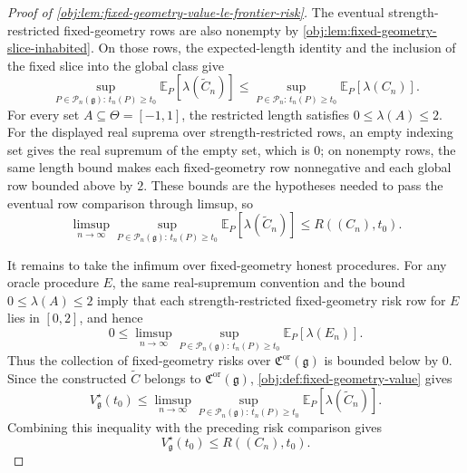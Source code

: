 \begin{proof}[Proof of \cref{obj:lem:fixed-geometry-value-le-frontier-risk}]
The eventual strength-restricted fixed-geometry rows are also nonempty by \cref{obj:lem:fixed-geometry-slice-inhabited}.  On those rows, the expected-length identity and the inclusion of the fixed slice into the global class give
\[
\sup_{P\in\mathcal P_n(\mathfrak g):\,t_n(P)\ge t_0}
\mathbb E_P[\lambda(\widetilde C_n)]
\le
\sup_{P\in\mathcal P_n:\,t_n(P)\ge t_0}
\mathbb E_P[\lambda(C_n)].
\]
For every set \(A\subseteq\Theta=[-1,1]\), the restricted length satisfies \(0\le\lambda(A)\le2\).  For the displayed real suprema over strength-restricted rows, an empty indexing set gives the real supremum of the empty set, which is \(0\); on nonempty rows, the same length bound makes each fixed-geometry row nonnegative and each global row bounded above by \(2\).  These bounds are the hypotheses needed to pass the eventual row comparison through limsup, so
\[
\limsup_{n\to\infty}
\sup_{P\in\mathcal P_n(\mathfrak g):\,t_n(P)\ge t_0}
\mathbb E_P[\lambda(\widetilde C_n)]
\le
R((C_n),t_0).
\]

It remains to take the infimum over fixed-geometry honest procedures.  For any oracle procedure \(E\), the same real-supremum convention and the bound \(0\le\lambda(A)\le2\) imply that each strength-restricted fixed-geometry risk row for \(E\) lies in \([0,2]\), and hence
\[
0\le
\limsup_{n\to\infty}
\sup_{P\in\mathcal P_n(\mathfrak g):\,t_n(P)\ge t_0}
\mathbb E_P[\lambda(E_n)].
\]
Thus the collection of fixed-geometry risks over \(\mathfrak C^{\mathrm{or}}(\mathfrak g)\) is bounded below by \(0\).  Since the constructed \(\widetilde C\) belongs to \(\mathfrak C^{\mathrm{or}}(\mathfrak g)\), \cref{obj:def:fixed-geometry-value} gives
\[
V_{\mathfrak g}^\star(t_0)
\le
\limsup_{n\to\infty}
\sup_{P\in\mathcal P_n(\mathfrak g):\,t_n(P)\ge t_0}
\mathbb E_P[\lambda(\widetilde C_n)].
\]
Combining this inequality with the preceding risk comparison gives
\[
V_{\mathfrak g}^\star(t_0)\le R((C_n),t_0).
\]
\end{proof}
